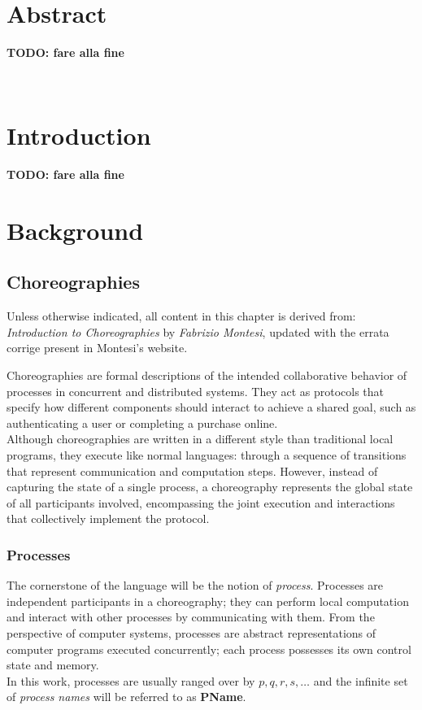 \documentclass[12pt,a4paper,twoside]{book}
\begin{document}
\newpage~\newpage

\chapter*{Abstract}
\textbf{TODO: fare alla fine}
\topmargin=-1cm

\tableofcontents
\thispagestyle{empty}

\newpage~\newpage


\raggedbottom
\chapter{Introduction} \label{chap:intro}
\pagestyle{plain}
\setcounter{page}{1}
\textbf{TODO: fare alla fine}

\chapter{Background} \label{chap:background}
\section{Choreographies}
\label{background:choreographies}
Unless otherwise indicated, all content in this chapter is derived from: \textit{Introduction to Choreographies\cite{montesi2023introduction}} by \textit{Fabrizio Montesi}, updated with the errata corrige present in Montesi's website\cite{montesiChoreographies}.
\vspace{10pt}

Choreographies are formal descriptions of the intended collaborative behavior of processes in concurrent and distributed systems. They act as protocols that specify how different components should interact to achieve a shared goal, such as authenticating a user or completing a purchase online.\\
Although choreographies are written in a different style than traditional local programs, they execute like normal languages: through a sequence of transitions that represent communication and computation steps. However, instead of capturing the state of a single process, a choreography represents the global state of all participants involved, encompassing the joint execution and interactions that collectively implement the protocol.


\subsection{Processes}
The cornerstone of the language will be the notion of \textit{process}. Processes are independent participants in a choreography; they can perform local computation and interact with other processes by communicating with them. From the perspective of computer systems, processes are abstract representations of computer programs executed concurrently; each process possesses its own control state and memory.\\
In this work, processes are usually ranged over by $p, q, r, s, \ldots$ and the infinite set of \textit{process names} will be referred to as \textbf{PName}.
\end{document}
